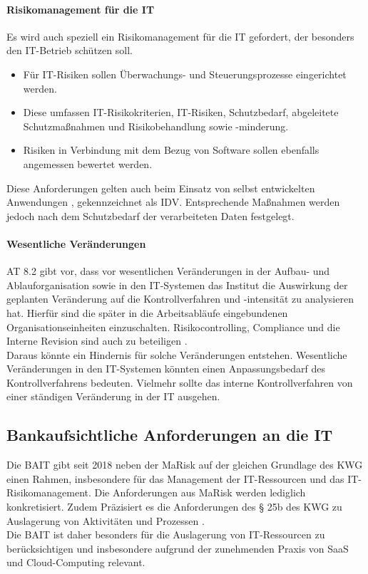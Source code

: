 \paragraph{Risikomanagement für die IT}
Es wird auch speziell ein Risikomanagement für die IT gefordert, der besonders den IT-Betrieb schützen soll.
\begin{itemize}
    \item Für IT-Risiken sollen Überwachungs- und Steuerungsprozesse eingerichtet werden.
    \item Diese umfassen IT-Risikokriterien, IT-Risiken, Schutzbedarf, abgeleitete Schutzmaßnahmen und Risikobehandlung sowie -minderung.
    \item Risiken in Verbindung mit dem Bezug von Software sollen ebenfalls angemessen bewertet werden.
\end{itemize}
Diese Anforderungen gelten auch beim Einsatz von selbst entwickelten Anwendungen \cite{MaRisk:2017}, gekennzeichnet als \ac{IDV}. Entsprechende Maßnahmen werden jedoch nach dem Schutzbedarf der verarbeiteten Daten festgelegt.


\paragraph{Wesentliche Veränderungen}
AT 8.2 gibt vor, dass vor wesentlichen Veränderungen in der Aufbau- und Ablauforganisation sowie in den IT-Systemen das Institut die Auswirkung der geplanten Veränderung auf die Kontrollverfahren und -intensität zu analysieren hat. Hierfür sind die später in die Arbeitsabläufe eingebundenen Organisationseinheiten einzuschalten. Risikocontrolling, Compliance und die Interne Revision sind auch zu beteiligen \cite{MaRisk:2017}. 
\\ %
Daraus könnte ein Hindernis für solche Veränderungen entstehen. Wesentliche Veränderungen in den IT-Systemen könnten einen Anpassungsbedarf des Kontrollverfahrens bedeuten. Vielmehr sollte das interne Kontrollverfahren von einer ständigen Veränderung in der IT ausgehen.

\subsection{Bankaufsichtliche Anforderungen an die IT}
Die \ac{BAIT} gibt seit 2018 neben der \ac{MaRisk} auf der gleichen Grundlage des \ac{KWG} einen  Rahmen, insbesondere für das Management der IT-Ressourcen und das IT-Risikomanagement. Die Anforderungen aus \ac{MaRisk} werden lediglich konkretisiert. Zudem Präzisiert es die Anforderungen des § 25b des
\ac{KWG} zu Auslagerung von Aktivitäten und Prozessen \cite{BAIT:2018}.
\\
Die \ac{BAIT} ist daher besonders für die Auslagerung von IT-Ressourcen zu berücksichtigen und insbesondere aufgrund der zunehmenden Praxis von \ac{SaaS} und Cloud-Computing relevant.

